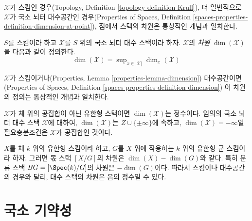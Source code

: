 \noindent
$\mathcal{X}$가 스킴인 경우(Topology, Definition
\ref{topology-definition-Krull}), 더 일반적으로 $\mathcal{X}$가
국소 뇌터 대수공간인 경우(Properties of Spaces, Definition
\ref{spaces-properties-definition-dimension-at-point}), 점에서 스택의 차원은
통상적인 개념과 일치한다.

\begin{definition}
\label{definition-dimension}
$S$를 스킴이라 하고 $\mathcal{X}$를 $S$ 위의 국소 뇌터 대수 스택이라 하자.
$\mathcal{X}$의 {\it 차원} $\dim(\mathcal{X})$을 다음과 같이 정의한다.
$$
\dim(\mathcal{X}) = \sup\nolimits_{x \in |\mathcal{X}|} \dim_x(\mathcal{X})
$$
\end{definition}

\noindent
$\mathcal{X}$가 스킴이거나(Properties, Lemma
\ref{properties-lemma-dimension}) 대수공간이면(Properties of Spaces,
Definition \ref{spaces-properties-definition-dimension})
이 차원의 정의는 통상적인 개념과 일치한다.

\begin{remark}
\label{remark-dimension-empty-stack}
$\mathcal{X}$가 체 위의 공집합이 아닌 유한형 스택이면
$\dim(\mathcal{X})$는 정수이다. 임의의 국소 뇌터 대수 스택
$\mathcal{X}$에 대하여,
$\dim(\mathcal{X})$는 $Z\cup \{\pm \infty\}$에 속하고,
$\dim(\mathcal{X}) = -\infty$일 필요충분조건은 $\mathcal{X}$가
공집합인 것이다.
\end{remark}

\begin{example}
\label{example-dimension-quotient-stack}
$X$를 체 $k$ 위의 유한형 스킴이라 하고, $G$를 $X$ 위에 작용하는
$k$ 위의 유한형 군 스킴이라 하자. 그러면 몫 스택 $[X/G]$의 차원은
$\dim(X)-\dim(G)$와 같다. 특히 분류 스택 $BG=[\Spec(k)/G]$의 차원은
$-\dim(G)$이다. 따라서 스킴이나 대수공간의 경우와 달리,
대수 스택의 차원은 음의 정수일 수 있다.
\end{example}






\section{국소 기약성}
\label{section-irreducible-local-ring}

